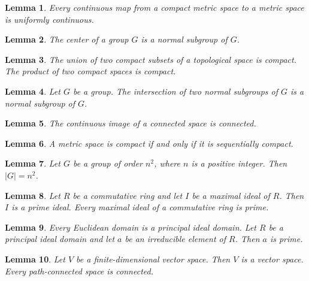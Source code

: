 \documentclass{article}
\newtheorem{lemma}{Lemma}
\begin{document}
\begin{lemma}\label{nested-maps}
Every continuous map from a compact metric space to a metric space is uniformly continuous.
\end{lemma}

\begin{lemma}\label{the-of-a}
The center of a group $G$ is a normal subgroup of $G$.
\end{lemma}

\begin{lemma}\label{two-objects}
The union of two compact subsets of a topological space is compact. The product of two compact spaces is compact.
\end{lemma}

\begin{lemma}\label{two-normal-subgroups}
Let $G$ be a group. The intersection of two normal subgroups of $G$ is a normal subgroup of $G$.
\end{lemma}

\begin{lemma}\label{continuous-image}
The continuous image of a connected space is connected.
\end{lemma}

\begin{lemma}\label{generic-statement}
A metric space is compact if and only if it is sequentially compact.
\end{lemma}

\begin{lemma}\label{where-prime}
Let $G$ be a group of order $n^2$, where $n$ is a positive integer. Then $|G|=n^2$.
\end{lemma}

\begin{lemma}\label{implied-complement}
Let $R$ be a commutative ring and let $I$ be a maximal ideal of $R$. Then $I$ is a prime ideal. Every maximal ideal of a commutative ring is prime.
\end{lemma}

\begin{lemma}\label{euclidean}
Every Euclidean domain is a principal ideal domain. Let $R$ be a principal ideal domain and let $a$ be an irreducible element of $R$. Then $a$ is prime.
\end{lemma}

\begin{lemma}\label{vector-space-alone}
Let $V$ be a finite-dimensional vector space. Then $V$ is a vector space. Every path-connected space is connected.
\end{lemma}
\end{document}
